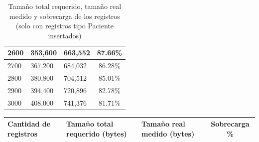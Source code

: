 \begin{table}[h]
\begin{tabular}{|l|p{4cm}|p{4cm}|c|}
2600 & 353,600 & 663,552 & 87.66\% \\ \hline
2700 & 367,200 & 684,032 & 86.28\% \\ \hline
2800 & 380,800 & 704,512 & 85.01\% \\ \hline
2900 & 394,400 & 720,896 & 82.78\% \\ \hline
3000 & 408,000 & 741,376 & 81.71\% \\ \hline
\end{tabular}
\caption{Tamaño total requerido, tamaño real medido y sobrecarga de los registros (solo con registros tipo Paciente insertados)}
\label{tabla:TamReqYRealConOverPacientes}
\end{table}

\begin{table}[h]
\centering
\begin{tabular}{|l|p{4cm}|p{4cm}|c|}
\hline
\textbf{Cantidad de registros} & \textbf{Tamaño total requerido (bytes)} & \textbf{Tamaño real medido (bytes)} & \textbf{Sobrecarga \%} \\ \hline


\end{tabular}
\end{table}
